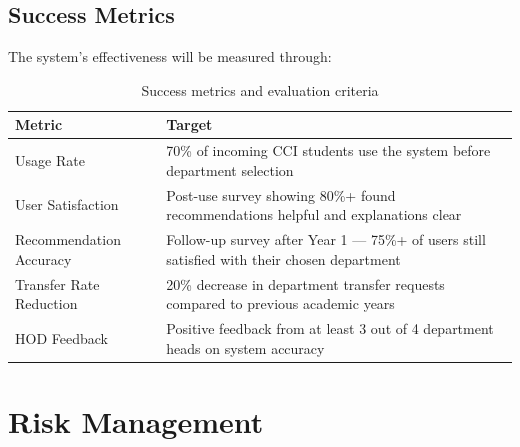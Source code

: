 \documentclass[12pt, a4paper]{article}
\begin{document}
\subsection{Success Metrics}

The system's effectiveness will be measured through:

\begin{table}[H]
\centering
\begin{tabularx}{0.95\textwidth}{lX}
\toprule
\textbf{Metric} & \textbf{Target} \\
\midrule
Usage Rate & 70\% of incoming CCI students use the system before department selection \\[3pt]
User Satisfaction & Post-use survey showing 80\%+ found recommendations helpful and explanations clear \\[3pt]
Recommendation Accuracy & Follow-up survey after Year 1 — 75\%+ of users still satisfied with their chosen department \\[3pt]
Transfer Rate Reduction & 20\% decrease in department transfer requests compared to previous academic years \\[3pt]
HOD Feedback & Positive feedback from at least 3 out of 4 department heads on system accuracy \\
\bottomrule
\end{tabularx}
\caption{Success metrics and evaluation criteria}
\end{table}

\section{Risk Management}
\end{document}
